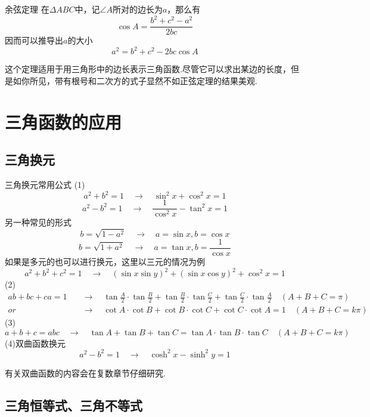 \documentclass[lang=cn, zihao=5]{elegantbook}
\begin{document}
\begin{theorem}{余弦定理} %
    在$\Delta ABC$中，记$\angle A$所对的边长为$a$，那么有$$\cos{A}=\frac{b^2+c^2-a^2}{2bc}$$
    因而可以推导出$a$的大小$$a^2=b^2+c^2-2bc \cos{A}$$
\end{theorem}
这个定理适用于用三角形中的边长表示三角函数.尽管它可以求出某边的长度，但是如你所见，带有根号和二次方的式子显然不如正弦定理的结果美观.

\section{三角函数的应用}

\subsection{三角换元}

\begin{proposition}{三角换元常用公式}
    (1)
    $$a^2+b^2=1 \quad \longrightarrow \quad \sin^2{x}+\cos^2{x}=1$$
    $$a^2-b^2=1 \quad \longrightarrow \quad \frac{1}{\cos^2 x}-\tan^2 {x}=1$$
    另一种常见的形式
    $$b=\sqrt{1-a^2} \quad \longrightarrow \quad a=\sin{x} , b=\cos{x}$$
    $$b=\sqrt{1+a^2} \quad \longrightarrow \quad a=\tan{x} , b=\frac{1}{\cos{x}}$$
    如果是多元的也可以进行换元，这里以三元的情况为例
    $$a^2+b^2+c^2=1 \quad \longrightarrow \quad (\sin{x}\sin{y})^2+(\sin{x}\cos{y})^2+\cos^2{x}=1$$
    (2)
    \begin{align*}
        ab+bc+ca=1 \quad & \longrightarrow \quad \tan{\frac{A}{2}} \cdot \tan{\frac{B}{2}} + \tan{\frac{B}{2}} \cdot \tan{\frac{C}{2}} + \tan{\frac{C}{2}} \cdot \tan{\frac{A}{2}} \quad (A+B+C=\pi) \\
        or & \longrightarrow \quad \cot{A} \cdot \cot{B} + \cot{B} \cdot \cot{C} + \cot{C} \cdot \cot{A} = 1 \quad (A+B+C=k\pi)
    \end{align*}
    (3)$$a+b+c=abc \quad \longrightarrow \quad \tan{A}+\tan{B}+\tan{C}=\tan{A} \cdot \tan{B} \cdot \tan{C} \quad (A+B+C=k\pi)$$
    (4)双曲函数换元
    $$a^2-b^2=1 \quad \longrightarrow \quad \cosh^2{x}-\sinh^2{y}=1$$
\end{proposition}
\begin{remark}
	有关双曲函数的内容会在复数章节仔细研究.
\end{remark}

\subsection{三角恒等式、三角不等式}
\end{document}
